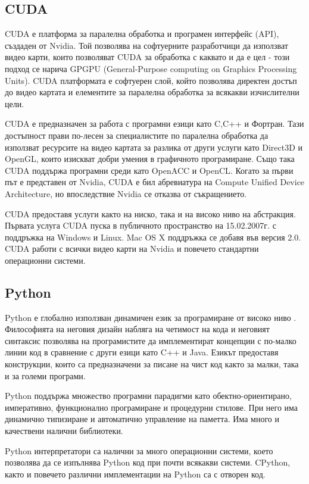 \subsection{CUDA}
CUDA е платформа за паралелна обработка и програмен интерфейс (API), създаден от Nvidia. Той позволява на софтуерните разработчици да използват видео карти, които позволяват CUDA за обработка с каквато и да е цел - този подход се нарича GPGPU (General-Purpose computing on Graphics Processing Units). CUDA платформата е софтуерен слой, който позволява директен достъп до видео картата и елементите за паралелна обработка за всякакви изчислителни цели. \cite{EndOfCPU}

CUDA е предназначен за работа с програмни езици като C,C++ и Фортран. Тази достъпност прави по-лесен за специалистите по паралелна обработка да използват ресурсите на видео картата за разлика от други услуги като Direct3D и OpenGL, които изискват добри умения в графичното програмиране. Също така CUDA поддържа програмни среди като OpenACC и OpenCL. Когато за първи път е представен от Nvidia, CUDA е бил абревиатура на Compute Unified Device Architecture, но впоследствие Nvidia се отказва от съкращението.

CUDA предоставя услуги както на ниско, така и на високо ниво на абстракция. Първата услуга CUDA пуска в публичното пространство на 15.02.2007г. с поддръжка на Windows и Linux. Mac OS X поддръжка се добавя във версия 2.0. CUDA работи с всички видео карти на Nvidia и повечето стандартни операционни системи.

\subsection{Python}

Python е глобално използван динамичен език за програмиране от високо ниво \cite{Python_1}. Философията на неговия дизайн набляга на четимост на кода и неговият синтаксис позволява на програмистите да имплементират концепции с по-малко линии код в сравнение с други езици като C++ и Java. Езикът предоставя конструкции, които са предназначени за писане на чист код както за малки, така и за големи програми. \cite{Python_2}

Python поддържа множество програмни парадигми като обектно-ориентирано, императивно, функционално програмиране и процедурни стилове. При него има динамично типизиране и автоматично управление на паметта. Има много и качествени налични библиотеки.

Python интерпретатори са налични за много операционни системи, което позволява да се изпълнява Python код при почти всякакви системи. CPython, както и повечето различни имплементации на Python са с отворен код.

